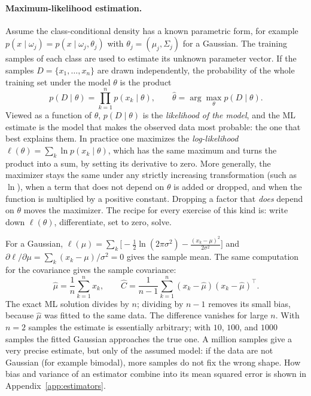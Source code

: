 \paragraph{Maximum-likelihood estimation.}
Assume the class-conditional density has a known parametric form, for example
$p(x\mid\omega_j) = p(x\mid\omega_j,\theta_j)$ with
$\theta_j = (\mu_j,\Sigma_j)$ for a Gaussian. The training samples of each class
are used to estimate its unknown parameter vector. If the samples
$D = \{x_1,\dots,x_n\}$ are drawn independently, the probability of the whole
training set under the model $\theta$ is the product
\begin{equation}
  p(D\mid\theta) = \prod_{k=1}^{n} p(x_k\mid\theta),
  \qquad
  \hat\theta = \arg\max_\theta p(D\mid\theta).
  \label{eq:ml}
\end{equation}
\noindent
Viewed as a function of $\theta$, $p(D\mid\theta)$ is the \emph{likelihood of
the model}, and the ML estimate is the model that makes the observed data most
probable: the one that best explains them. In practice one maximizes the
\emph{log-likelihood} $\ell(\theta) = \sum_k \ln p(x_k\mid\theta)$, which has the
same maximum and turns the product into a sum, by setting its derivative to
zero. More generally, the maximizer stays the same under any strictly
increasing transformation (such as $\ln$), when a term that does not depend on
$\theta$ is added or dropped, and when the function is multiplied by a positive
constant. Dropping a factor that \emph{does} depend on $\theta$ moves the
maximizer. The recipe for every exercise of this kind is: write down $\ell(\theta)$,
differentiate, set to zero, solve.

For a Gaussian, $\ell(\mu) = \sum_k \bigl[-\frac12\ln(2\pi\sigma^2)
- \frac{(x_k-\mu)^2}{2\sigma^2}\bigr]$ and
$\partial\ell/\partial\mu = \sum_k (x_k-\mu)/\sigma^2 = 0$ gives the sample
mean. The same computation for the covariance gives the sample covariance:
\begin{equation}
  \hat\mu = \frac1n\sum_{k=1}^n x_k,
  \qquad
  \hat C = \frac{1}{n-1}\sum_{k=1}^n (x_k-\hat\mu)(x_k-\hat\mu)^\top .
  \label{eq:ml-gauss}
\end{equation}
\noindent
The exact ML solution divides by $n$; dividing by $n-1$ removes its small bias,
because $\hat\mu$ was fitted to the same data. The difference vanishes for large
$n$. With $n = 2$ samples the estimate is essentially arbitrary; with $10$,
$100$, and $1000$ samples the fitted Gaussian approaches the true one. A
million samples give a very precise estimate, but only of the assumed model: if
the data are not Gaussian (for example bimodal), more samples do not fix the
wrong shape. How bias and variance of an estimator combine into its mean
squared error is shown in Appendix~\ref{app:estimators}.

